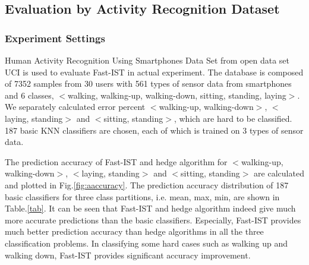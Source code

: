 \documentclass[letterpaper]{article}
\begin{document}
\subsection{Evaluation by Activity Recognition Dataset}
\subsubsection{Experiment Settings}
%

 Human Activity Recognition Using Smartphones Data Set from open data set UCI \cite{Lichman:2013} is used to evaluate Fast-IST in actual experiment.
 The database is composed of 7352 samples from 30 users with 561 types of sensor data from smartphones and 6 classes, $<$walking, walking-up, walking-down, sitting, standing, laying$>$. We separately calculated error percent $<$walking-up, walking-down$>$, $<$laying, standing$>$ and $<$sitting, standing$>$, which are hard to be classified. 187 basic KNN classifiers are chosen, each of which is trained on 3 types of sensor data.
  


The prediction accuracy of Fast-IST and hedge algorithm for $<$walking-up, walking-down$>$, $<$laying, standing$>$ and $<$sitting, standing$>$ are calculated and plotted in Fig.\ref{fig:aaccuracy}. The prediction accuracy distribution of 187 basic classifiers for three class partitions, i.e. mean, max, min, are shown in Table.\ref{tab}. It can be seen that Fast-IST and hedge algorithm indeed give much more accurate predictions than the basic classifiers. Especially, Fast-IST provides much better prediction accuracy than hedge algorithms in all the three classification problems. In classifying some hard cases such as walking up and walking down, Fast-IST provides significant accuracy improvement.
\end{document}
